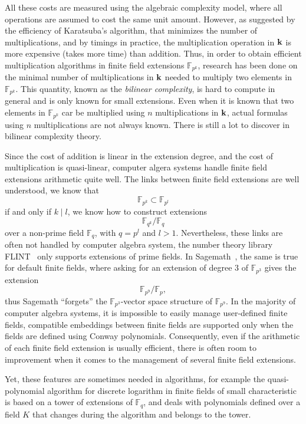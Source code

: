 All these costs are measured using the algebraic complexity model, where all operations
are assumed to cost the same unit amount. However, as suggested by the
efficiency of Karatsuba's algorithm, that minimizes the number of
multiplications, and by timings in practice, the multiplication operation in $\mathbf{k}$
is more expensive (\ie takes more time) than addition. Thus, in order to obtain
efficient multiplication algorithms in finite field extensions
$\mathbb{F}_{p^{k}}$, research has been done on the minimal number of
multiplications in $\mathbf{k}$ needed to multiply two elements in
$\mathbb{F}_{p^{k}}$. This quantity, known as the \emph{bilinear complexity}, is
hard to compute in general and is only known for small extensions. Even when it
is known that two elements in $\mathbb{F}_{p^{k}}$ car be multiplied using $n$
multiplications in $\mathbf{k}$, actual formulas using $n$ multiplications are not
always known. There is still a lot to discover in bilinear complexity theory.

Since the cost of addition is linear in the extension degree, and the cost of
multiplication is quasi-linear, computer algera systems handle finite field
extensions arithmetic quite well. The links between finite
field extensions are well understood, \eg we know that
\[
  \mathbb{F}_{p^{k}}\subset\mathbb{F}_{p^{l}}
\]
if and only if $k\mid l$, we know how to construct extensions
\[
  \mathbb{F}_{q^k}/\mathbb{F}_{q}
\]
over a non-prime field $\mathbb{F}_{q}$, with $q=p^l$ and $l>1$. Nevertheless,
these links are often not handled by computer algebra system, \eg the number
theory library FLINT~\cite{Flint} only supports extensions of prime fields. In
Sagemath~\cite{Sagemath}, the same is true for default finite fields, where
asking for an extension of degree $3$ of $\mathbb{F}_{p^{3}}$ gives the
extension
\[
  \mathbb{F}_{p^{9}}/\mathbb{F}_p,
\]
thus Sagemath ``forgets'' the $\mathbb{F}_{p^{3}}$-vector space structure of
$\mathbb{F}_{p^{9}}$. In the majority of computer algebra systems, it is
impossible to easily manage user-defined finite fields, \ie compatible
embeddings between finite fields are supported only when the fields are defined
using Conway polynomials. Consequently, even if the arithmetic of each finite
field extension is usually efficient, there is often room to improvement when it
comes to the management of several finite field extensions.

Yet, these features are sometimes needed in algorithms, for example the
quasi-polynomial algorithm for discrete logarithm in finite fields of small
characteristic~\cite{GKZ14} is based on a tower of extensions of $\mathbb{F}_q$,
and deals with polynomials defined over a field $K$ that changes during the
algorithm and belongs to the tower.

